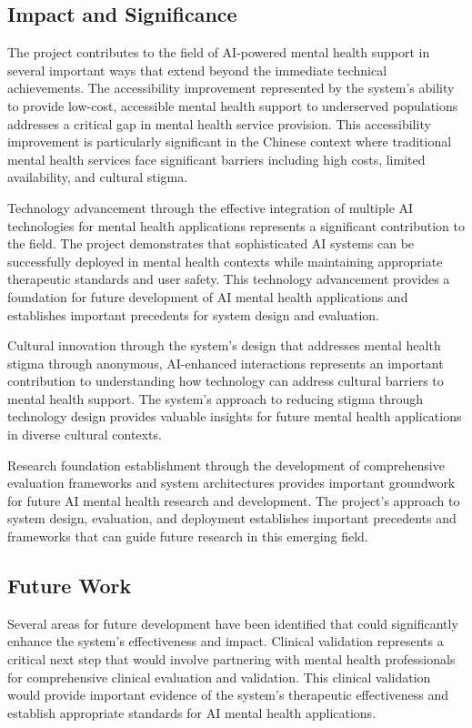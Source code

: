 \subsection{Impact and Significance}

The project contributes to the field of AI-powered mental health support in several important ways that extend beyond the immediate technical achievements. The accessibility improvement represented by the system's ability to provide low-cost, accessible mental health support to underserved populations addresses a critical gap in mental health service provision. This accessibility improvement is particularly significant in the Chinese context where traditional mental health services face significant barriers including high costs, limited availability, and cultural stigma.

Technology advancement through the effective integration of multiple AI technologies for mental health applications represents a significant contribution to the field. The project demonstrates that sophisticated AI systems can be successfully deployed in mental health contexts while maintaining appropriate therapeutic standards and user safety. This technology advancement provides a foundation for future development of AI mental health applications and establishes important precedents for system design and evaluation.

Cultural innovation through the system's design that addresses mental health stigma through anonymous, AI-enhanced interactions represents an important contribution to understanding how technology can address cultural barriers to mental health support. The system's approach to reducing stigma through technology design provides valuable insights for future mental health applications in diverse cultural contexts.

Research foundation establishment through the development of comprehensive evaluation frameworks and system architectures provides important groundwork for future AI mental health research and development. The project's approach to system design, evaluation, and deployment establishes important precedents and frameworks that can guide future research in this emerging field.

\subsection{Future Work}

Several areas for future development have been identified that could significantly enhance the system's effectiveness and impact. Clinical validation represents a critical next step that would involve partnering with mental health professionals for comprehensive clinical evaluation and validation. This clinical validation would provide important evidence of the system's therapeutic effectiveness and establish appropriate standards for AI mental health applications.

